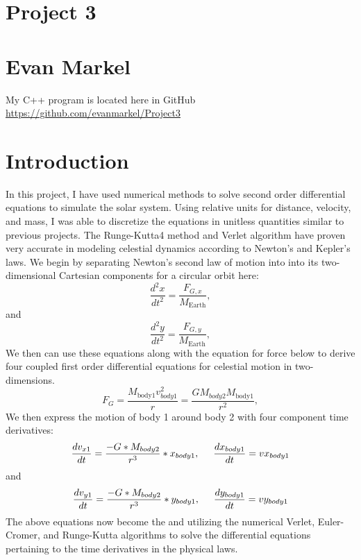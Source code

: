 \documentclass[11pt,a4wide]{article}
\begin{document}
\section*{Project 3}
\section*{Evan Markel}

My C++ program is located here in GitHub \url{https://github.com/evanmarkel/Project3}

\section*{Introduction}
%
In this project, I have used numerical methods to solve second order differential equations to simulate the solar system. Using relative units for distance, velocity, and mass, I was able to discretize the equations in unitless quantities similar to previous projects. The Runge-Kutta4 method and Verlet algorithm have proven very accurate in modeling celestial dynamics according to Newton's and Kepler's laws. We begin by separating Newton's second law of motion into into its two-dimensional Cartesian components for a circular orbit here: 
\[
\frac{d^2x}{dt^2}=\frac{F_{G,x}}{M_{\mathrm{Earth}}},
\]
and 
\[
\frac{d^2y}{dt^2}=\frac{F_{G,y}}{M_{\mathrm{Earth}}},
\]\newline
We then can use these equations along with the equation for force below to derive four coupled first order differential equations for celestial motion in two-dimensions. 
\[
F_G= \frac{M_{\mathrm{body1}}v_{body1}^2}{r}=\frac{GM_{body2}M_{\mathrm{body1}}}{r^2},
\]\newline
We then express the motion of body 1 around body 2 with four component time derivatives: 
\[
\frac{dv_{x1}}{dt}=\frac{-G*M_{body2}}{r^{3}}*x_{body1}, \hspace{.5 cm} \frac{dx_{body1}}{dt}=vx_{body1}
\]
and
\[
\frac{dv_{y1}}{dt}=\frac{-G*M_{body2}}{r^{3}}*y_{body1}, \hspace{.5 cm} \frac{dy_{body1}}{dt}=vy_{body1}
\]
The above equations now become the and utilizing the numerical Verlet, Euler-Cromer, and Runge-Kutta algorithms to solve the differential equations pertaining to the time derivatives in the physical laws. 
\end{document}
